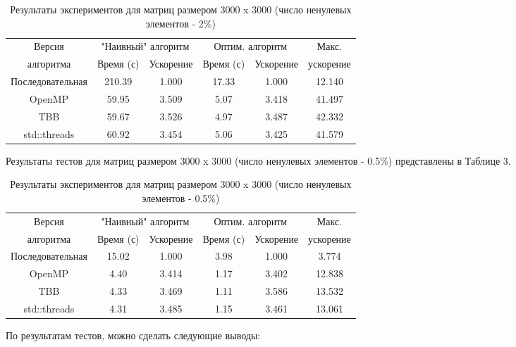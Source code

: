 \documentclass{report}
\begin{document}
	\begin{table}[!h]
		\caption{Результаты экспериментов для матриц размером 3000 x 3000 (число ненулевых элементов - 2\%)}
		\centering
		\begin{tabular}{|c|c|c|c|c|c|}
			\hline
			Версия &
			\multicolumn{2}{|c|}{"Наивный"{} алгоритм} &
			\multicolumn{2}{|c|}{Оптим. алгоритм} &
			Макс. \\
			\cline{2-5}
			алгоритма	&  Время (с)  &  Ускорение  &   Время (с)  &  Ускорение  &  ускорение   \\
			\hline
			Последовательная	&	210.39	&	1.000	&	17.33	&	1.000	&	12.140	\\
			\hline
			OpenMP			&	59.95	&	3.509	&	5.07	&	3.418	&	41.497	\\
			\hline
			TBB				&	59.67	&	3.526	&	4.97	&	3.487	&	42.332	\\
			\hline
			std::threads		&	60.92	&	3.454	&	5.06	&	3.425	&	41.579	\\
			\hline
		\end{tabular}
	\end{table}
	\par Результаты тестов для матриц размером 3000 x 3000 (число ненулевых элементов - 0.5\%) представлены в Таблице 3.
	\begin{table}[!h]
		\caption{Результаты экспериментов для матриц размером 3000 x 3000 (число ненулевых элементов - 0.5\%)}
		\centering
		\begin{tabular}{|c|c|c|c|c|c|}
			\hline
			Версия &
			\multicolumn{2}{|c|}{"Наивный"{} алгоритм} &
			\multicolumn{2}{|c|}{Оптим. алгоритм} &
			Макс. \\
			\cline{2-5}
			алгоритма	&  Время (с)  &  Ускорение  &   Время (с)  &  Ускорение  &  ускорение   \\
			\hline
			Последовательная	&	15.02	&	1.000	&	3.98	&	1.000	&	3.774	\\
			\hline
			OpenMP			&	4.40	&	3.414	&	1.17	&	3.402	&	12.838	\\
			\hline
			TBB				&	4.33	&	3.469	&	1.11	&	3.586	&	13.532	\\
			\hline
			std::threads		&	4.31	&	3.485	&	1.15	&	3.461	&	13.061	\\
			\hline
		\end{tabular}
	\end{table}
	\par По результатам тестов, можно сделать следующие выводы:
\end{document}
